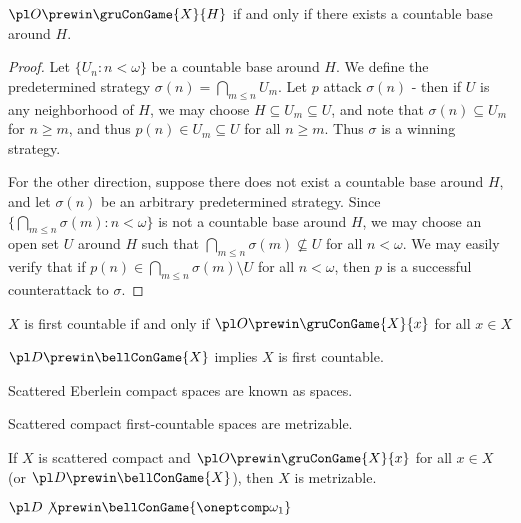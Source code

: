 \newpage

\begin{thm}
  $\pl O \prewin \gruConGame{X}{H}$ if and only if there exists a countable base
  around $H$.
\end{thm}

\begin{proof}
  Let $\{U_n:n<\omega\}$ be a countable base around $H$. We define the
  predetermined strategy $\sigma(n)=\bigcap_{m\leq n}U_m$. Let $p$ attack
  $\sigma(n)$ - then if $U$ is any neighborhood of $H$, we may choose
  $H\subseteq U_m\subseteq U$, and note that $\sigma(n)\subseteq U_m$ for
  $n\geq m$, and thus $p(n)\in U_m\subseteq U$ for all $n\geq m$. Thus
  $\sigma$ is a winning strategy.

  For the other direction, suppose there does not exist a countable base
  around $H$, and let $\sigma(n)$ be an arbitrary predetermined strategy.
  Since $\{\bigcap_{m\leq n}\sigma(m):n<\omega\}$ is not a countable base
  around $H$, we may choose an open set $U$ around $H$ such that
  $\bigcap_{m\leq n}\sigma(m)\not\subseteq U$ for all $n<\omega$. We may
  easily verify that if $p(n)\in\bigcap_{m\leq n}\sigma(m)\setminus U$ for
  all $n<\omega$, then $p$ is a successful counterattack to $\sigma$.
\end{proof}

\begin{cor}
  $X$ is first countable if and only if $\pl O \prewin \gruConGame{X}{x}$ for
  all $x\in X$
\end{cor}

\begin{cor}
  $\pl D \prewin \bellConGame{X}$ implies $X$ is first countable.
\end{cor}

\begin{defn}
  Scattered Eberlein compact spaces are known as  spaces.
\end{defn}

\begin{thm}[folklore]
  Scattered compact first-countable spaces are metrizable.
\end{thm}

\begin{cor}
  If $X$ is scattered compact and $\pl O \prewin\gruConGame{X}{x}$ for all
  $x\in X$ (or $\pl D \prewin\bellConGame{X}$), then $X$ is metrizable.
\end{cor}


\begin{ex}
  $\pl D \not\prewin \bellConGame{\oneptcomp\omega_1}$
\end{ex}

